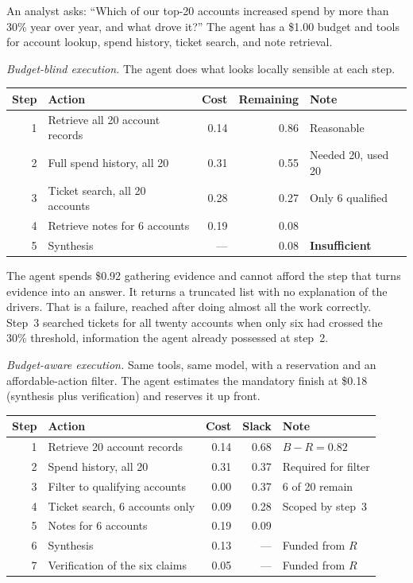 \documentclass[11pt]{book}
\begin{document}
An analyst asks: ``Which of our top-20 accounts increased spend by more than 30\% year over year, and what drove it?'' The agent has a \$1.00 budget and tools for account lookup, spend history, ticket search, and note retrieval.

\textit{Budget-blind execution.} The agent does what looks locally sensible at each step.

\begin{center}
\begin{tabular}{rlrrl}
\toprule
Step & Action & Cost & Remaining & Note \\
\midrule
1 & Retrieve all 20 account records & 0.14 & 0.86 & Reasonable \\
2 & Full spend history, all 20 & 0.31 & 0.55 & Needed 20, used 20 \\
3 & Ticket search, all 20 accounts & 0.28 & 0.27 & Only 6 qualified \\
4 & Retrieve notes for 6 accounts & 0.19 & 0.08 & \\
5 & Synthesis & --- & 0.08 & \textbf{Insufficient} \\
\bottomrule
\end{tabular}
\end{center}

The agent spends \$0.92 gathering evidence and cannot afford the step that turns evidence into an answer. It returns a truncated list with no explanation of the drivers. That is a failure, reached after doing almost all the work correctly. Step~3 searched tickets for all twenty accounts when only six had crossed the 30\% threshold, information the agent already possessed at step~2.

\textit{Budget-aware execution.} Same tools, same model, with a reservation and an affordable-action filter. The agent estimates the mandatory finish at \$0.18 (synthesis plus verification) and reserves it up front.

\begin{center}
\begin{tabular}{rlrrl}
\toprule
Step & Action & Cost & Slack & Note \\
\midrule
1 & Retrieve 20 account records & 0.14 & 0.68 & $B{-}R = 0.82$ \\
2 & Spend history, all 20 & 0.31 & 0.37 & Required for filter \\
3 & Filter to qualifying accounts & 0.00 & 0.37 & 6 of 20 remain \\
4 & Ticket search, 6 accounts only & 0.09 & 0.28 & Scoped by step~3 \\
5 & Notes for 6 accounts & 0.19 & 0.09 & \\
6 & Synthesis & 0.13 & --- & Funded from $R$ \\
7 & Verification of the six claims & 0.05 & --- & Funded from $R$ \\
\bottomrule
\end{tabular}
\end{center}
\end{document}
